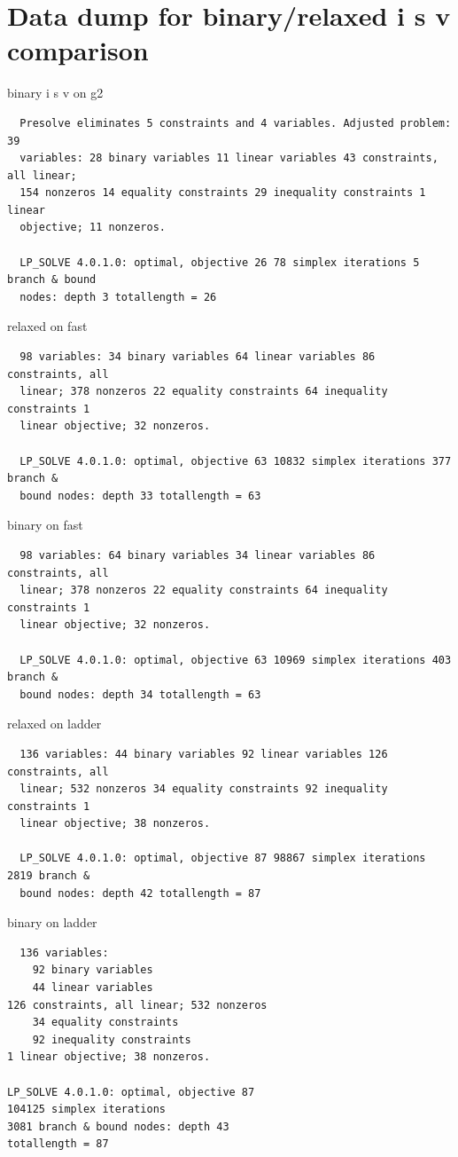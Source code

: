 \documentclass{article}
\begin{document}
\section{Data dump for binary/relaxed i s v comparison}
binary i s v on g2
\begin{lstlisting}
  Presolve eliminates 5 constraints and 4 variables. Adjusted problem: 39
  variables: 28 binary variables 11 linear variables 43 constraints, all linear;
  154 nonzeros 14 equality constraints 29 inequality constraints 1 linear
  objective; 11 nonzeros.

  LP_SOLVE 4.0.1.0: optimal, objective 26 78 simplex iterations 5 branch & bound
  nodes: depth 3 totallength = 26
\end{lstlisting}
relaxed on fast
\begin{lstlisting}
  98 variables: 34 binary variables 64 linear variables 86 constraints, all
  linear; 378 nonzeros 22 equality constraints 64 inequality constraints 1
  linear objective; 32 nonzeros.

  LP_SOLVE 4.0.1.0: optimal, objective 63 10832 simplex iterations 377 branch &
  bound nodes: depth 33 totallength = 63
\end{lstlisting}
binary on fast

\begin{lstlisting}
  98 variables: 64 binary variables 34 linear variables 86 constraints, all
  linear; 378 nonzeros 22 equality constraints 64 inequality constraints 1
  linear objective; 32 nonzeros.

  LP_SOLVE 4.0.1.0: optimal, objective 63 10969 simplex iterations 403 branch &
  bound nodes: depth 34 totallength = 63
\end{lstlisting}


relaxed on ladder

\begin{lstlisting}
  136 variables: 44 binary variables 92 linear variables 126 constraints, all
  linear; 532 nonzeros 34 equality constraints 92 inequality constraints 1
  linear objective; 38 nonzeros.

  LP_SOLVE 4.0.1.0: optimal, objective 87 98867 simplex iterations 2819 branch &
  bound nodes: depth 42 totallength = 87
\end{lstlisting}


binary on ladder
\begin{lstlisting}
  136 variables:
	92 binary variables
	44 linear variables
126 constraints, all linear; 532 nonzeros
	34 equality constraints
	92 inequality constraints
1 linear objective; 38 nonzeros.

LP_SOLVE 4.0.1.0: optimal, objective 87
104125 simplex iterations
3081 branch & bound nodes: depth 43
totallength = 87
\end{lstlisting}
\end{document}
